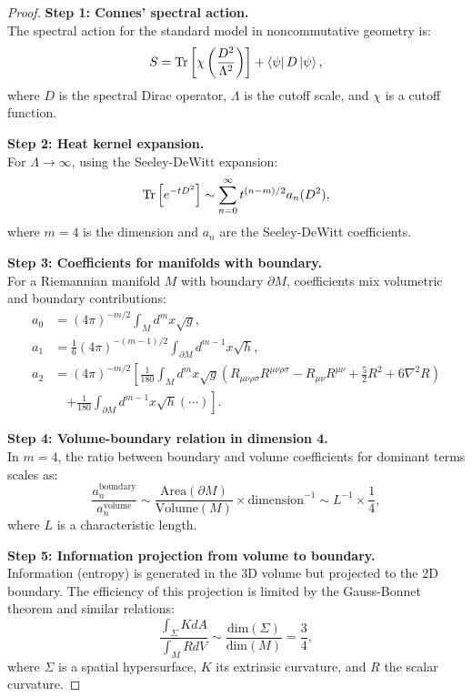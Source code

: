 \documentclass[11pt, a4paper]{article}
\theoremstyle{plain}
\theoremstyle{definition}
\begin{document}
\begin{proof}
\textbf{Step 1: Connes' spectral action.} \\
The spectral action for the standard model in noncommutative geometry is:
\begin{equation}
S = \Tr\left[\chi\left(\frac{D^2}{\Lambda^2}\right)\right] + \bra{\psi} D \ket{\psi},
\end{equation}
where $D$ is the spectral Dirac operator, $\Lambda$ is the cutoff scale, and $\chi$ is a cutoff function.

\textbf{Step 2: Heat kernel expansion.} \\
For $\Lambda \to \infty$, using the Seeley-DeWitt expansion:
\begin{equation}
\Tr\left[e^{-tD^2}\right] \sim \sum_{n=0}^\infty t^{(n-m)/2} a_n(D^2),
\end{equation}
where $m=4$ is the dimension and $a_n$ are the Seeley-DeWitt coefficients.

\textbf{Step 3: Coefficients for manifolds with boundary.} \\
For a Riemannian manifold $M$ with boundary $\partial M$, coefficients mix volumetric and boundary contributions:
\begin{align}
a_0 &= (4\pi)^{-m/2} \int_M d^m x \sqrt{g}, \\
a_1 &= \frac{1}{6}(4\pi)^{-(m-1)/2} \int_{\partial M} d^{m-1} x \sqrt{h}, \\
a_2 &= (4\pi)^{-m/2} \left[\frac{1}{180} \int_M d^m x \sqrt{g} (R_{\mu\nu\rho\sigma}R^{\mu\nu\rho\sigma} - R_{\mu\nu}R^{\mu\nu} + \frac{5}{2}R^2 + 6\nabla^2 R) \right. \\
&\quad \left. + \frac{1}{180} \int_{\partial M} d^{m-1} x \sqrt{h} (\cdots) \right].
\end{align}

\textbf{Step 4: Volume-boundary relation in dimension 4.} \\
In $m=4$, the ratio between boundary and volume coefficients for dominant terms scales as:
\begin{equation}
\frac{a_n^{\text{boundary}}}{a_n^{\text{volume}}} \sim \frac{\text{Area}(\partial M)}{\text{Volume}(M)} \times \text{dimension}^{-1} \sim L^{-1} \times \frac{1}{4},
\end{equation}
where $L$ is a characteristic length.

\textbf{Step 5: Information projection from volume to boundary.} \\
Information (entropy) is generated in the 3D volume but projected to the 2D boundary. The efficiency of this projection is limited by the Gauss-Bonnet theorem and similar relations:
\begin{equation}
\frac{\int_{\Sigma} K dA}{\int_M R dV} \sim \frac{\text{dim}(\Sigma)}{\text{dim}(M)} = \frac{3}{4},
\end{equation}
where $\Sigma$ is a spatial hypersurface, $K$ its extrinsic curvature, and $R$ the scalar curvature.


\end{proof}
\end{document}
